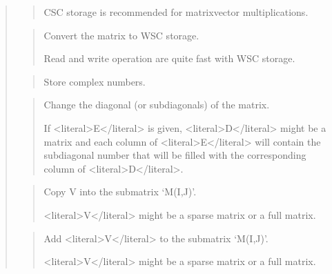 \documentclass[a4paper,11pt,english]{sphinxmanual}
\begin{document}
\begin{quote}
\begin{quote}
\sphinxAtStartPar
CSC storage is recommended for matrix\sphinxhyphen{}vector multiplications.
\end{quote}

\sphinxAtStartPar
{}
\begin{quote}

\sphinxAtStartPar
Convert the matrix to WSC storage.

\sphinxAtStartPar
Read and write operation are quite fast with WSC storage.
\end{quote}

\sphinxAtStartPar
{}
\begin{quote}

\sphinxAtStartPar
Store complex numbers.
\end{quote}

\sphinxAtStartPar
{}
\begin{quote}

\sphinxAtStartPar
Change the diagonal (or sub\sphinxhyphen{}diagonals) of the matrix.

\sphinxAtStartPar
If \textless{}literal\textgreater{}E\textless{}/literal\textgreater{} is given, \textless{}literal\textgreater{}D\textless{}/literal\textgreater{} might be a matrix and each column of \textless{}literal\textgreater{}E\textless{}/literal\textgreater{} will
contain the sub\sphinxhyphen{}diagonal number that will be filled with the
corresponding column of \textless{}literal\textgreater{}D\textless{}/literal\textgreater{}.
\end{quote}

\sphinxAtStartPar
{}
\begin{quote}

\sphinxAtStartPar
Copy V into the sub\sphinxhyphen{}matrix ‘M(I,J)’.

\sphinxAtStartPar
\textless{}literal\textgreater{}V\textless{}/literal\textgreater{} might be a sparse matrix or a full matrix.
\end{quote}

\sphinxAtStartPar
{}
\begin{quote}

\sphinxAtStartPar
Add \textless{}literal\textgreater{}V\textless{}/literal\textgreater{} to the sub\sphinxhyphen{}matrix ‘M(I,J)’.

\sphinxAtStartPar
\textless{}literal\textgreater{}V\textless{}/literal\textgreater{} might be a sparse matrix or a full matrix.
\end{quote}
\end{quote}
\end{document}
